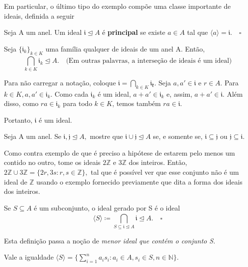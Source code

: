 \documentclass[algebraII_notes.tex]{subfiles}
\begin{document}
Em particular, o último tipo do exemplo compõe uma classe importante de ideais, definida a seguir
\begin{def*}
	Seja A um anel. Um ideal \(\mathfrak{i}\trianglelefteq{A}\) é \textbf{principal} se existe \(a\in A\) tal que \(\langle a \rangle = \mathfrak{i}.\quad\square\)
\end{def*}
\begin{lemma*}
	Seja \(\{\mathfrak{i}_{k}\}_{k\in K}\) uma família qualquer de ideais de um anel A. Então,
	\[
		\bigcap_{k\in K}^{}{\mathfrak{i}_{k}}\trianglelefteq{A}.\quad \text{(Em outras palavras, a interseção de ideais é um ideal)}
	\]
\end{lemma*}
\begin{proof*}
	Para não carregar a notação, coloque \(\mathfrak{i} = \bigcap_{k\in K}^{}{\mathfrak{i_{k}}}.\) Seja \(a, a'\in \mathfrak{i}\) e \(r\in A\).
	Para \(k\in K, a, a'\in \mathfrak{i}_{k}\). Como cada \(\mathfrak{i}_{k}\) é um ideal, \(a + a'\in \mathfrak{i}_{k}\) e, assim,
	\(a + a'\in \mathfrak{i}.\) Além disso, como \(ra\in \mathfrak{i}_{k}\) para todo \(k\in K\), temos também \(ra \in \mathfrak{i}.\)

	Portanto, \(\mathfrak{i}\) é um ideal. \qedsymbol
\end{proof*}
\begin{prop*}[Exercício]
	Seja A um anel. Se \(\mathfrak{i}, \mathfrak{j}\trianglelefteq{A},\) mostre que \(\mathfrak{i}\cup \mathfrak{j}\trianglelefteq{A}\) se, e somente se,
	\(\mathfrak{i}\subseteq{\mathfrak{j}}\) ou \(\mathfrak{j}\subseteq{\mathfrak{i}}.\)
\end{prop*}
Como contra exemplo de que é preciso a hipótese de estarem pelo menos um contido no outro, tome os ideais \(2 \mathbb{Z}\) e \(3 \mathbb{Z}\) dos inteiros.
Então, \(2\mathbb{Z}\cup 3 \mathbb{Z} = \{2r, 3s: r, s \in \mathbb{Z}\},\) tal que é possível ver que esse conjunto não é um ideal de \(\mathbb{Z}\) usando o exemplo
fornecido previamente que dita a forma dos ideais dos inteiros.
\begin{def*}
	Se \(S\subseteq{A}\) é um subconjunto, o ideal gerado por S é o ideal
	\[
		\langle S \rangle\coloneqq \bigcap_{S\subseteq{\mathfrak{i}}\trianglelefteq{A}}^{}{\mathfrak{i}} \trianglelefteq{A}.\quad\square
	\]
\end{def*}
Esta definição passa a noção de \textit{menor ideal que contém o conjunto S.}
\begin{lemma*}
	Vale a igualdade \(\langle S \rangle = \{\sum\limits_{i=1}^{n}a_{i}s_{i}: a_{i}\in A, s_{i}\in S, n\in \mathbb{N}\}.\)
\end{lemma*}
\end{document}
